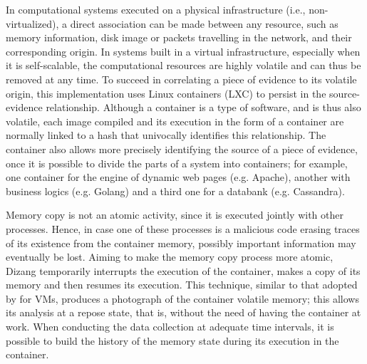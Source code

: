 \documentclass[conference]{IEEEtran}
\newcommand{\fancyname}{Dizang }
\begin{document}
In computational systems executed on a physical infrastructure (i.e., non-virtualized), a direct association can be made between any resource, such as memory information, disk image or packets travelling in the network, and their corresponding origin.
%
In systems built in a virtual infrastructure, especially when it is self-scalable, the computational resources are highly volatile and can thus be removed at any time.
%
To succeed in correlating a piece of evidence to its volatile origin, this implementation uses Linux containers (LXC) to persist in the source-evidence relationship.
%
Although a container is a type of software, and is thus also volatile, each image compiled and its execution in the form of a container are normally linked to a hash that univocally identifies this relationship.
%
The container also allows more precisely identifying the source of a piece of evidence, once it is possible to divide the parts of a system into containers; for example, one container for the engine of dynamic web pages (e.g. Apache), another with business logics (e.g. Golang) and a third one for a databank (e.g. Cassandra).


Memory copy is not an atomic activity, since it is executed jointly with other processes.
%
Hence, in case one of these processes is a malicious code erasing traces of its existence from the container memory, possibly important information may eventually be lost. 
%
Aiming to make the memory copy process more atomic, \fancyname temporarily interrupts the execution of the container, makes a copy of its memory and then resumes its execution. 
%
This technique, similar to that adopted by \cite{Rafique_Static_Live_Digital_Forensics:2013} for VMs, produces a photograph of the container volatile memory; this allows its analysis at a repose state, that is, without the need of having the container at work.
%
When conducting the data collection at adequate time intervals, it is possible to build the history of the memory state during its execution in the container.
%
\end{document}
